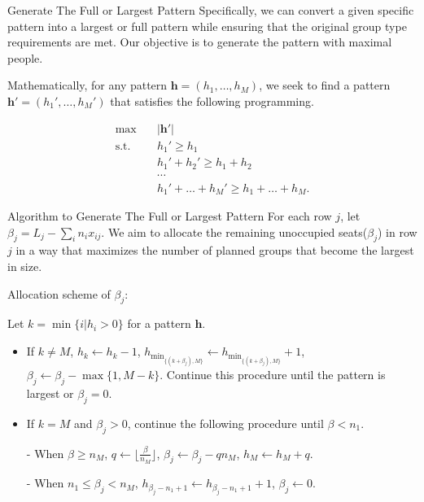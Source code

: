   \begin{frame}{Generate The Full or Largest Pattern}
    Specifically, we can convert a given specific pattern into a largest or full pattern while ensuring that the original group type requirements are met. Our objective is to generate the pattern with maximal people.

    Mathematically, for any pattern $\bm{h} = (h_1, \ldots, h_M)$, we seek to find a pattern $\bm{h}{'} = (h_1{'}, \ldots, h_M{'})$ that satisfies the following programming.

    \begin{equation*}\label{full_largest}
      \begin{aligned}
      \max \quad & |\bm{h}{'}| \\
      \text {s.t.} \quad & h_1{'} \geq h_1 \\
      &  h_1{'} + h_2{'} \geq h_1 + h_2 \\
      & \cdots \\
      & h_1{'} + \ldots + h_M{'} \geq h_1 + \ldots + h_M.
      \end{aligned}
    \end{equation*}
  \end{frame}

  \begin{frame}{Algorithm to Generate The Full or Largest Pattern}
    For each row $j$, let $\beta_{j} = L_{j} - \sum_{i} n_{i} x_{ij}$. We aim to allocate the remaining unoccupied seats($\beta_{j}$) in row $j$ in a way that maximizes the number of planned groups that become the largest in size.
    \vspace{0.5cm}
    
    Allocation scheme of $\beta_{j}$:
    \vspace{0.5cm}

    \begin{scriptsize}
      Let $k = \min\{i | h_i > 0\}$ for a pattern $\bm{h}$.

      \begin{itemize}
        \item If $k \neq M$, $h_{k} \gets h_{k} -1$, $h_{\min_{\{(k+\beta_{j}), M\}}} \gets h_{\min_{\{(k+\beta_{j}), M\}}} +1$, $\beta_{j} \gets \beta_{j} - \max\{1, M - k\}$. Continue this procedure until the pattern is largest or $\beta_{j} =0$.
        \item If $k = M$ and $\beta_{j} > 0$, continue the following procedure until $\beta < n_{1}$.
        \item[-] When $\beta \geq n_{M}$, $q \gets \lfloor\frac{\beta}{n_M}\rfloor$, $\beta_{j} \gets \beta_{j} - q n_M$, $h_{M} \gets h_{M} + q$.
        \item[-] When $n_{1} \leq \beta_{j} < n_{M}$, $h_{\beta_{j}-n_1+1} \gets h_{\beta_{j}-n_1+1} + 1$, $\beta_{j} \gets 0$.
      \end{itemize}  
    \end{scriptsize}
    
  \end{frame}